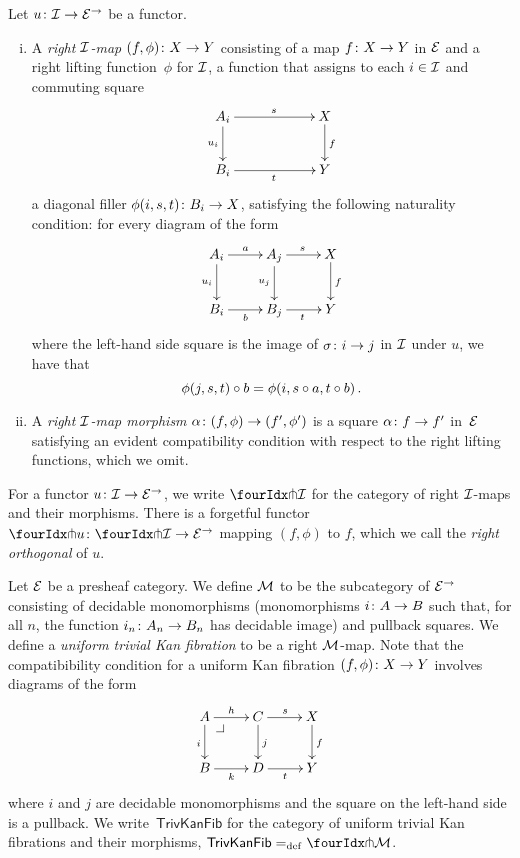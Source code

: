 \documentclass[reqno,10pt,a4paper,oneside,draft]{amsart}
\begin{document}
\begin{definition}
Let $u \co \cal{I} \to \catE^\to$ be a functor.
\begin{enumerate}[(i)]
\item A \emph{right $\cal{I}$-map} $(f, \phi) \co X \to Y$ consisting of a map $f \co X \to Y$ in $\cal{E}$ and a right lifting function~$\phi$ for $\cal{I}$, \ie a function that assigns to each $i \in \cal{I}$ and commuting square
\[
\xymatrix@C=2cm{
A_i \ar[r]^{s} \ar[d]_{u_i} & X \ar[d]^f \\
B_i \ar[r]_{t} & Y}
\]
a diagonal filler $\phi(i,s, t) \co B_i \to X$, satisfying the following naturality condition: for every diagram of the form
\[
\xymatrix{
A_i \ar[r]^a \ar[d]_{u_i} & A_j \ar[r]^{s} \ar[d]_{u_j} & X \ar[d]^f \\
B_i \ar[r]_{b} & B_j \ar[r]_{t} & Y }
\]
where the left-hand side square is the image of $\sigma \co i \to j$ in $\cal{I}$ under $u$, we have that
\[
\phi(j, s, t) \cc b = \phi(i, s \cc a, t \cc b) \, .
\]
\item A \emph{right $\cal{I}$-map morphism} $\alpha \co (f, \phi) \to (f', \phi')$ is a square $\alpha \co f \to f'$ in~$\catE$ satisfying an evident compatibility condition with respect to the right lifting functions, which we omit.
\end{enumerate}
\end{definition}

For a functor $u \co \cal{I} \to \catE^\to$, we write $\liftr{\cal{I}}$ for the category of right $\cal{I}$-maps and their morphisms.
There is a forgetful functor~$\liftr{u} \co \liftr{\cal{I}} \to \catE^\to$ mapping $(f, \phi)$ to $f$, which we call the \emph{right orthogonal} of $u$.

\begin{example} \label{exa-triv-kan-fib}
Let $\catE$ be a presheaf category.
We define $\cal{M}$ to be the subcategory of $\cal{E}^\to$ consisting of decidable monomorphisms (\ie monomorphisms $i \co A \to B$ such that, for all $n$, the function $i_n \co A_n \to B_n$ has decidable image) and pullback squares.
We define a \emph{uniform trivial Kan fibration}  to be a right $\cal{M}$-map. Note that  the compatibibility condition
for a uniform Kan fibration $(f, \phi) \co X \to Y$ involves diagrams of the form
\[
\xymatrix{
A \ar[r]^{h} \ar[d]_{i} \pullback{dr} & C \ar[d]^{j} \ar[r]^s & X \ar[d]^f \\
B \ar[r]_{k} & D \ar[r]_t & Y }
\]
where $i$ and $j$ are decidable monomorphisms and the square on the left-hand side is a pullback.
We write~$\mathsf{TrivKanFib}$ for the category of uniform trivial Kan fibrations and their morphisms, \ie $\mathsf{TrivKanFib} \defeq \liftr{\cal{M}}$.
\end{example}
\end{document}
